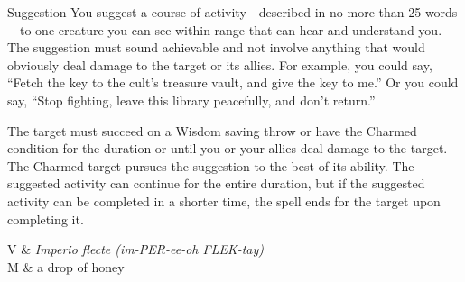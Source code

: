 \begin{Spell}[
  tags=Concentration,
  level={2nd},
  time={1 action},
  range={30 ft.},
  components={V, M},
  duration={8 hours},
  school={Enchantment},
  attack={WIS Save},
  effect={Control}
]{Suggestion}
You suggest a course of activity---described in no more than 25 words---to one creature you can see within range that can hear and understand you. The suggestion must sound achievable and not involve anything that would obviously deal damage to the target or its allies. For example, you could say, ``Fetch the key to the cult's treasure vault, and give the key to me.'' Or you could say, ``Stop fighting, leave this library peacefully, and don't return.''

The target must succeed on a Wisdom saving throw or have the Charmed condition for the duration or until you or your allies deal damage to the target. The Charmed target pursues the suggestion to the best of its ability. The suggested activity can continue for the entire duration, but if the suggested activity can be completed in a shorter time, the spell ends for the target upon completing it.

\begin{components}
V & \textit{Imperio flecte (im-PER-ee-oh FLEK-tay)} \\
M & a drop of honey
\end{components}
\end{Spell}



